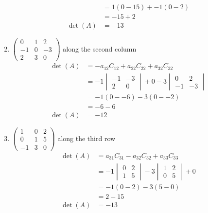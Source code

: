 \documentclass[13pt]{article}
\begin{document}
\begin{enumerate}[label=(\alph*),leftmargin=*]
\begin{align*}
                &= 1(0 - 15) + -1(0 - 2) \\
                &= -15 + 2 \\
        \det(A) &= -13
      \end{align*}
    \item $
      \begin{pmatrix}
        0 & 1 & 2 \\
        -1 & 0 & -3 \\
        2 & 3 & 0         
      \end{pmatrix}
      $ along the second column
      \begin{align*}
        \det(A) &= -a_{12}C_{12} + a_{22}C_{22} + a_{32}C_{32} \\
                &= -1
                  \begin{vmatrix}
                    -1 & -3 \\
                    2 & 0
                  \end{vmatrix} + 0 - 3
                  \begin{vmatrix}
                    0 & 2 \\
                    -1 & -3
                  \end{vmatrix} \\
                &= -1(0 - -6) - 3(0 - -2) \\
                &= -6 - 6 \\
        \det(A) &= -12
      \end{align*}
    \item $
      \begin{pmatrix}
        1 & 0 & 2 \\
        0 & 1 & 5 \\
        -1 & 3 & 0
      \end{pmatrix}
      $ along the third row
      \begin{align*}
        \det(A) &= a_{31}C_{31} - a_{32}C_{32} + a_{33}C_{33} \\
                &= -1
                  \begin{vmatrix}
                    0 & 2 \\
                    1 & 5
                  \end{vmatrix} - 3
                  \begin{vmatrix}
                    1 & 2 \\
                    0 & 5
                  \end{vmatrix} + 0 \\
                &= -1(0 - 2) - 3(5 - 0) \\
                &= 2 - 15 \\
        \det(A) &= -13
      \end{align*}     
    \end{enumerate}
\end{document}
